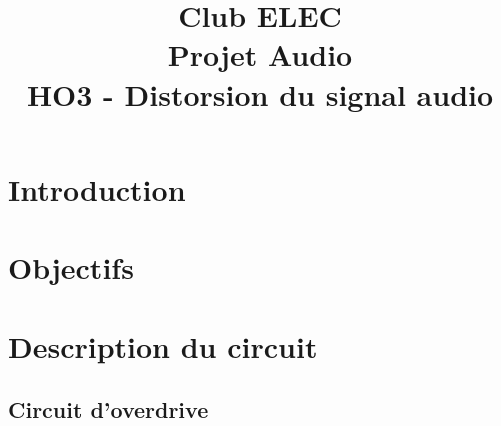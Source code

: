 \documentclass[a4paper,10pt,twoside]{article}
\title{	
	\vspace{2.5cm}
	\normalfont \normalsize 
	\huge Club ELEC\\ 
	\vspace{2.5cm}
	\huge Projet Audio\\
	\vspace{.25cm}
	\Large HO3 - Distorsion du signal audio
	\vspace{2.5cm}
	\centering
}
\begin{document}
\renewcommand{\figurename}{Figure}
\renewcommand{\thepage}{\roman{page}}
\setcounter{page}{1}

\maketitle
\newpage
{}
\pagestyle{main}

\newpage
\null
\thispagestyle{empty}
\newpage
\clearpage

\setcounter{page}{1}

\section*{Introduction}


\section*{Objectifs}


\newpage

\section*{Description du circuit}


%

\newpage

\subsection*{Circuit d'overdrive}

\end{document}
